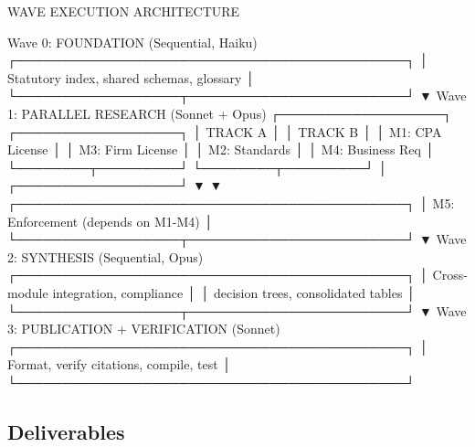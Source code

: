 \documentclass[11pt,letterpaper]{article}
\begin{document}
\begin{asciibox}
  WAVE EXECUTION ARCHITECTURE

  Wave 0: FOUNDATION (Sequential, Haiku)
  ┌───────────────────────────────────────────┐
  │  Statutory index, shared schemas, glossary │
  └──────────────────┬────────────────────────┘
                     ▼
  Wave 1: PARALLEL RESEARCH (Sonnet + Opus)
  ┌──────────────────┐    ┌──────────────────┐
  │  TRACK A          │    │  TRACK B          │
  │  M1: CPA License  │    │  M3: Firm License │
  │  M2: Standards    │    │  M4: Business Req │
  └────────┬─────────┘    └────────┬─────────┘
           │    ┌──────────────────┘
           ▼    ▼
  ┌───────────────────────────────────────────┐
  │  M5: Enforcement (depends on M1-M4)       │
  └──────────────────┬────────────────────────┘
                     ▼
  Wave 2: SYNTHESIS (Sequential, Opus)
  ┌───────────────────────────────────────────┐
  │  Cross-module integration, compliance     │
  │  decision trees, consolidated tables      │
  └──────────────────┬────────────────────────┘
                     ▼
  Wave 3: PUBLICATION + VERIFICATION (Sonnet)
  ┌───────────────────────────────────────────┐
  │  Format, verify citations, compile, test  │
  └───────────────────────────────────────────┘
\end{asciibox}

\subsection{Deliverables}
\end{document}
